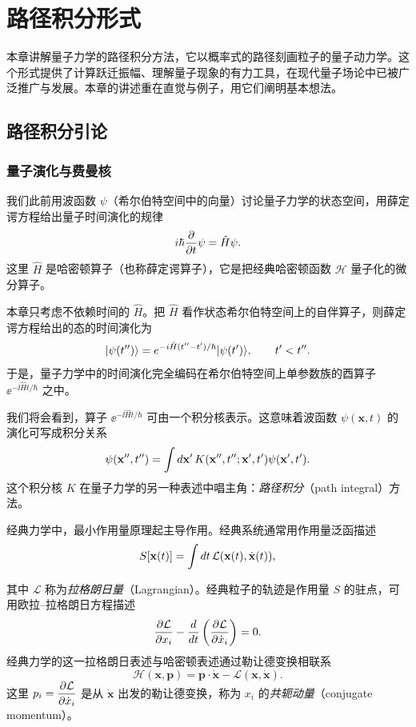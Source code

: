 
\chapter{路径积分形式}

本章讲解量子力学的路径积分方法，它以概率式的路径刻画粒子的量子动力学。这个形式提供了计算跃迁振幅、理解量子现象的有力工具，在现代量子场论中已被广泛推广与发展。本章的讲述重在直觉与例子，用它们阐明基本想法。

\section{路径积分引论}

\subsection{量子演化与费曼核}

我们此前用波函数 $\psi$（希尔伯特空间中的向量）讨论量子力学的状态空间，用薛定谔方程给出量子时间演化的规律
\[
i\hbar\frac{\partial}{\partial t}\psi=\hat H\psi.
\]
这里 $\hat H$ 是哈密顿算子（也称薛定谔算子），它是把经典哈密顿函数 $\mathcal H$ 量子化的微分算子。

本章只考虑不依赖时间的 $\hat H$。把 $\hat H$ 看作状态希尔伯特空间上的自伴算子，则薛定谔方程给出的态的时间演化为
\[
|\psi(t'')\rangle=e^{-i\hat H(t''-t')/\hbar}|\psi(t')\rangle,
\qquad t'<t''.
\]
于是，量子力学中的时间演化完全编码在希尔伯特空间上单参数族的酉算子 $\ee^{-\ii\hat Ht/\hbar}$ 之中。

我们将会看到，算子 $\ee^{-\ii\hat Ht/\hbar}$ 可由一个积分核表示。这意味着波函数 $\psi(\mathbf{x},t)$ 的演化可写成积分关系
\[
\psi(\mathbf{x}'',t'')
=\int d\mathbf{x}'\,K(\mathbf{x}'',t'';\mathbf{x}',t')\psi(\mathbf{x}',t').
\]
这个积分核 $K$ 在量子力学的另一种表述中唱主角：\emph{路径积分}（path integral）方法。

经典力学中，最小作用量原理起主导作用。经典系统通常用作用量泛函描述
\[
S[\mathbf{x}(t)]=\int d t\,\mathcal L(\mathbf{x}(t),\dot{\mathbf{x}}(t)),
\]

其中 $\mathcal L$ 称为\emph{拉格朗日量}（Lagrangian）。经典粒子的轨迹是作用量 $S$ 的驻点，可用欧拉–拉格朗日方程描述
\[
\frac{\partial\mathcal L}{\partial x_i}
-\frac{d}{d t}\left(\frac{\partial\mathcal L}{\partial\dot x_i}\right)=0.
\]
经典力学的这一拉格朗日表述与哈密顿表述通过勒让德变换相联系
\[
\mathcal H(\mathbf{x},\mathbf{p})=\mathbf{p}\cdot\dot{\mathbf{x}}-\mathcal L(\mathbf{x},\dot{\mathbf{x}}).
\]
这里 $p_i=\dfrac{\partial\mathcal L}{\partial\dot x_i}$ 是从 $\dot{\mathbf{x}}$ 出发的勒让德变换，称为 $x_i$ 的\emph{共轭动量}（conjugate momentum）。

